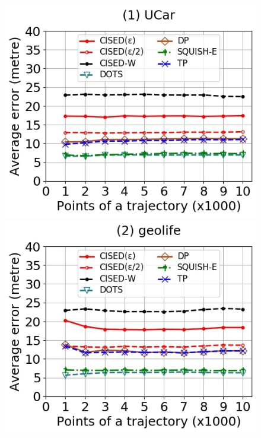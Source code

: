 {\begin{figure}[tb!]
	\centering
	\includegraphics[scale=0.250]{Figures/Exp-where-SED-error-size-service.jpg} 	\hspace{0.5ex}
	\includegraphics[scale=0.250]{Figures/Exp-where-SED-error-size-geolife.jpg}	\hspace{0.5ex}

\end{figure}}
